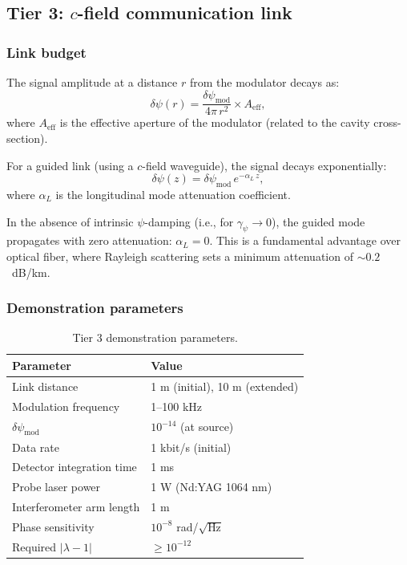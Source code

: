 \documentclass[aps,prd,twocolumn,superscriptaddress,nofootinbib,floatfix]{revtex4-2}
\newcommand{\psifield}{\psi}
\begin{document}
\subsection{Tier 3: $c$-field communication link}
\label{subsec:tier3}

\subsubsection{Link budget}

The signal amplitude at a distance $r$ from the modulator decays
as:
\begin{equation}
\delta\psifield(r) = \frac{\delta\psifield_{\text{mod}}}{4\pi\,r^2}
\times A_{\text{eff}},
\label{eq:link_budget}
\end{equation}
where $A_{\text{eff}}$ is the effective aperture of the modulator
(related to the cavity cross-section).

For a guided link (using a $c$-field waveguide), the signal decays
exponentially:
\begin{equation}
\delta\psifield(z) = \delta\psifield_{\text{mod}}\,
e^{-\alpha_L\,z},
\label{eq:guided_decay}
\end{equation}
where $\alpha_L$ is the longitudinal mode attenuation coefficient.

In the absence of intrinsic $\psifield$-damping (i.e., for
$\gamma_\psi \to 0$), the guided mode propagates with zero
attenuation: $\alpha_L = 0$. This is a fundamental advantage over
optical fiber, where Rayleigh scattering sets a minimum attenuation
of $\sim 0.2$~dB/km.

\subsubsection{Demonstration parameters}

\begin{table}[h]
\caption{Tier 3 demonstration parameters.}
\label{tab:tier3_specs}
\begin{ruledtabular}
\begin{tabular}{ll}
Parameter & Value \\
\hline
Link distance & 1 m (initial), 10 m (extended) \\
Modulation frequency & 1--100 kHz \\
$\delta\psifield_{\text{mod}}$ & $10^{-14}$ (at source) \\
Data rate & 1 kbit/s (initial) \\
Detector integration time & 1 ms \\
Probe laser power & 1 W (Nd:YAG 1064 nm) \\
Interferometer arm length & 1 m \\
Phase sensitivity & $10^{-8}$ rad/$\sqrt{\text{Hz}}$ \\
Required $|\lambda-1|$ & $\geq 10^{-12}$ \\
\end{tabular}
\end{ruledtabular}
\end{table}
\end{document}
